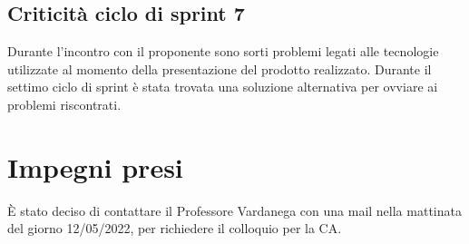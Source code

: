 \documentclass[a4paper, 12pt]{article}
\begin{document}
\subsection{Criticità ciclo di sprint 7}
Durante l'incontro con il proponente sono sorti problemi legati alle tecnologie utilizzate al momento della presentazione del prodotto realizzato. Durante il settimo ciclo di sprint è stata trovata una soluzione alternativa per ovviare ai problemi riscontrati.

\section{Impegni presi}
È stato deciso di contattare il Professore Vardanega con una mail nella mattinata del giorno 12/05/2022, per richiedere il colloquio per la CA.
\end{document}
